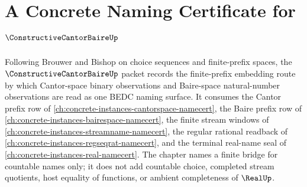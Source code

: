 \chapter{A Concrete Naming Certificate for $\ConstructiveCantorBaireUp$}
\label{ch:concrete-instances-constructive-cantor-baire-namecert}

Following Brouwer and Bishop on choice sequences and finite-prefix spaces, the $\ConstructiveCantorBaireUp$ packet records the finite-prefix embedding route by which Cantor-space binary observations and Baire-space natural-number observations are read as one BEDC naming surface. It consumes the Cantor prefix row of \autoref{ch:concrete-instances-cantorspace-namecert}, the Baire prefix row of \autoref{ch:concrete-instances-bairespace-namecert}, the finite stream windows of \autoref{ch:concrete-instances-streamname-namecert}, the regular rational readback of \autoref{ch:concrete-instances-regseqrat-namecert}, and the terminal real-name seal of \autoref{ch:concrete-instances-real-namecert}. The chapter names a finite bridge for countable names only; it does not add countable choice, completed stream quotients, host equality of functions, or ambient completeness of $\RealUp$.

